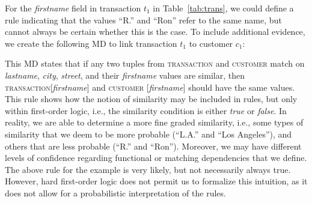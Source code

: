 For the \textsl{firstname} field in transaction $t_1$ in Table~\ref{tab:trans}, we could define a rule indicating that the values ``R.'' and ``Ron'' refer to the same name, but cannot always be certain whether this is the case. To include additional evidence, we create the following MD to link transaction $t_1$ to customer $c_1$:\\ 
\vspace*{-0.5cm}
\begin{table}[h]\footnotesize
\scriptsize
\centering
{}
\end{table}
\vspace*{-0.5cm}

This MD states that if any two tuples from \textsc{transaction} and \textsc{customer} match on \textsl{lastname}, \textsl{city}, \textsl{street}, and their \textsl{firstname} values are similar, then \textsc{transaction}[\textsl{firstname}] and \textsc{customer} [\textsl{firstname}] should have the same values. This rule shows how the notion of similarity may be included in rules, but only within first-order logic, i.e., the similarity condition is either \emph{true} or \emph{false}. In reality, we are able to determine a more fine graded similarity, i.e., some types of similarity that we deem to be more probable (``L.A.'' and ``Los Angeles''), and others that are less probable (``R.'' and ``Ron''). Moreover, we may have different levels of confidence regarding functional or matching dependencies that we define. The above rule for the example is very likely, but not necessarily always true. However, hard first-order logic does not permit us to formalize this intuition, as it does not allow for a probabilistic interpretation of the rules.